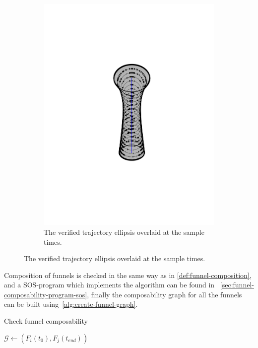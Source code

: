 \begin{figure}
\begin{subfigure}[b]{0.5\textwidth}
    \includegraphics[trim={5cm 5cm 5cm 5cm},
    width=\textwidth]{figures/method/funnel-sampled}
    \caption{The verified trajectory ellipsis overlaid at the sample times.}
  \end{subfigure}
\end{figure}

Composition of funnels is checked in the same way as in
\cref{def:funnel-composition}, and a \ac{SOS}-program which implements the
algorithm can be found in ~\cref{sec:funnel-composability-program-sos}, finally
the composability graph for all the funnels can be built
using~\cref{alg:create-funnel-graph}.

\begin{algorithm}
  \caption{Check funnel composability}
  \label{alg:create-funnel-graph}
  \DontPrintSemicolon \SetAlgoNoLine


  {  { %
      { \(\mathcal{G} \leftarrow{} \left( F_{i}(t_{0}), F_{j}(t_{end})
        \right)\)%
      }%
    }%
  }
\end{algorithm}

